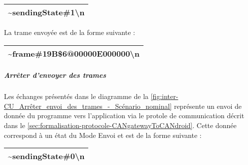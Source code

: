 \begin{minipage}
    \textwidth
    \centering
    \begin{tabular}{|c|}
        \hline
        \textasciitilde{}sendingState\#1\textbackslash n\\
        \hline
    \end{tabular}
\end{minipage}

\medspace

La trame envoyée est de la forme suivante :\\

\begin{minipage}
    \textwidth
    \centering
    \begin{tabular}{|c|}
        \hline
        \textasciitilde{}frame\#19B\$6@00000E000000\textbackslash n\\
        \hline
    \end{tabular}
\end{minipage}

\medspace

\subparagraph{Arrêter d'envoyer des trames \newline}

\medspace

Les échanges présentés dans le diagramme de la \autoref{fig:inter-CU_Arrêter_envoi_des_trames_-_Scénario_nominal} représente un envoi de donnée du programme {\nomLogiciel} vers l'application {\nomApplication} via le protole de communication décrit dans le \autoref{sec:formalisation-protocole-CANgatewayToCANdroid}. Cette donnée correspond à un état du Mode Envoi et est de la forme suivante :\\

\begin{minipage}
    \textwidth
    \centering
    \begin{tabular}{|c|}
        \hline
        \textasciitilde{}sendingState\#0\textbackslash n\\
        \hline
    \end{tabular}
\end{minipage}